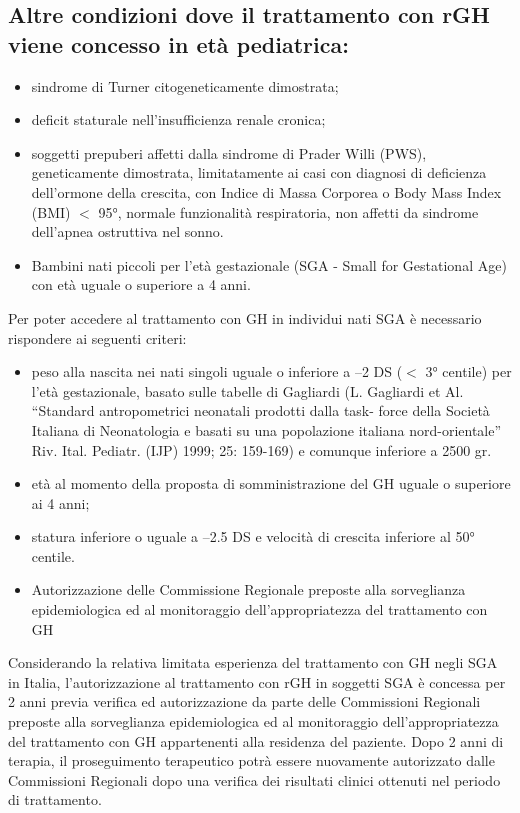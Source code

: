 \subsection*{Altre condizioni dove il trattamento con rGH viene concesso in et\`a pediatrica:}

\begin{itemize}
\item sindrome di Turner citogeneticamente dimostrata;
\item deficit staturale nell'insufficienza renale cronica;
\item soggetti prepuberi affetti dalla sindrome di Prader Willi (PWS), geneticamente dimostrata, limitatamente ai
casi con diagnosi di deficienza dell'ormone della crescita, con Indice di Massa Corporea o Body Mass
Index (BMI) $<$ 95°, normale funzionalit\`a respiratoria, non affetti da sindrome dell'apnea ostruttiva nel
sonno.
\item Bambini nati piccoli per l'et\`a gestazionale (SGA - Small for Gestational Age) con et\`a uguale o superiore a
4 anni.
\end{itemize}

Per poter accedere al trattamento con GH in individui nati SGA \`e necessario rispondere ai seguenti criteri:
\begin{itemize}
\item peso alla nascita nei nati singoli uguale o inferiore a –2 DS ($<$ 3° centile) per l'et\`a gestazionale, basato
sulle tabelle di Gagliardi (L. Gagliardi et Al. “Standard antropometrici neonatali prodotti dalla task-
force della Societ\`a Italiana di Neonatologia e basati su una popolazione italiana nord-orientale” Riv.
Ital. Pediatr. (IJP) 1999; 25: 159-169) e comunque inferiore a 2500 gr.
\item et\`a al momento della proposta di somministrazione del GH uguale o superiore ai 4 anni;
\item statura inferiore o uguale a –2.5 DS e velocit\`a di crescita inferiore al 50° centile.
\item Autorizzazione delle Commissione Regionale preposte alla sorveglianza epidemiologica ed al
monitoraggio dell'appropriatezza del trattamento con GH
\end{itemize}

Considerando la relativa limitata esperienza del trattamento con GH negli SGA in Italia, l'autorizzazione al
trattamento con rGH in soggetti SGA \`e concessa per 2 anni previa verifica ed autorizzazione da parte delle
Commissioni Regionali preposte alla sorveglianza epidemiologica ed al monitoraggio dell'appropriatezza del
trattamento con GH appartenenti alla residenza del paziente. Dopo 2 anni di terapia, il proseguimento
terapeutico potr\`a essere nuovamente autorizzato dalle Commissioni Regionali dopo una verifica dei risultati
clinici ottenuti nel periodo di trattamento.

